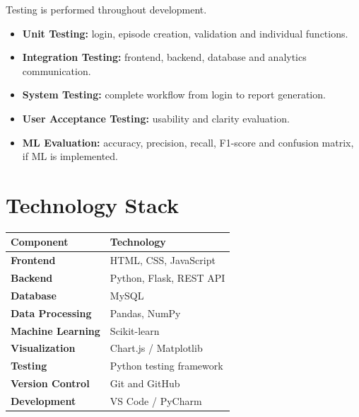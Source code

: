\documentclass[11pt,a4paper]{article}
\begin{document}
Testing is performed throughout development.

\begin{itemize}
\item \textbf{Unit Testing:} login, episode creation, validation and individual functions.
\item \textbf{Integration Testing:} frontend, backend, database and analytics communication.
\item \textbf{System Testing:} complete workflow from login to report generation.
\item \textbf{User Acceptance Testing:} usability and clarity evaluation.
\item \textbf{ML Evaluation:} accuracy, precision, recall, F1-score and confusion matrix, if ML is implemented.
\end{itemize}

\begin{center}
\end{center}

\section{Technology Stack}

\begin{center}
\begin{tabular}{>{\bfseries}p{}p{}}
\toprule
Component & Technology\\
\midrule
Frontend & HTML, CSS, JavaScript\\
Backend & Python, Flask, REST API\\
Database & MySQL\\
Data Processing & Pandas, NumPy\\
Machine Learning & Scikit-learn\\
Visualization & Chart.js / Matplotlib\\
Testing & Python testing framework\\
Version Control & Git and GitHub\\
Development & VS Code / PyCharm\\
\bottomrule
\end{tabular}
\end{center}
\end{document}
